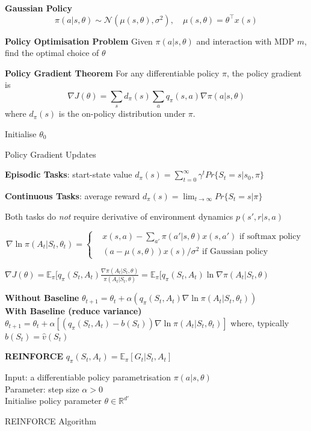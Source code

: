 \documentclass[10pt,landscape]{article}
\begin{document}
\begin{multicols}{3}
\textbf{Gaussian Policy} $$\pi(a|s, \theta) \sim \mathcal{N}(\mu(s, \theta), \sigma^2), \quad \mu(s, \theta) = \theta^\top x(s)$$

\textbf{Policy Optimisation Problem} Given $\pi(a|s, \theta)$ and interaction with MDP $m$, find the optimal choice of $\theta$

\textbf{Policy Gradient Theorem} For any differentiable policy $\pi$, the policy gradient is $$\nabla J(\theta) = \sum_s d_\pi (s) \sum_a q_\pi (s,a) \nabla \pi(a|s, \theta)$$ where $d_\pi(s)$ is the on-policy distribution under $\pi$. 

\begin{algorithm}[H]
Initialise $\theta_0$
\caption{Policy Gradient Updates}
\end{algorithm}

\textbf{Episodic Tasks}: start-state value $d_\pi (s) = \sum_{t=0}^\infty \gamma^t Pr\{S_t = s | s_0, \pi\}$

\textbf{Continuous Tasks}: average reward $d_\pi (s) = \lim_{t \rightarrow \infty} Pr\{S_t = s | \pi\}$

Both tasks do \textit{not} require derivative of environment dynamics $p(s', r|s,a)$

$$\nabla \ln \pi(A_t | S_t, \theta_t) = \begin{cases}& x(s,a) - \sum_{a'} \pi(a' | s, \theta) x(s, a') \text{ if softmax policy } \\ & (a - \mu(s, \theta)) x(s)/\sigma^2 \text{ if Gaussian policy }\end{cases}$$

$\nabla J(\theta) = \mathbb{E}_\pi [q_\pi(S_t, A_t) \frac{\nabla \pi(A_t | S_t, \theta)}{\pi (A_t | S_t, \theta)} = \mathbb{E}_\pi [q_\pi(S_t, A_t) \ln \nabla \pi(A_t | S_t, \theta)$

\textbf{Without Baseline} $\theta_{t+1} = \theta_t + \alpha(q_\pi(S_t, A_t) \nabla \ln \pi(A_t | S_t, \theta_t))$ \\
\textbf{With Baseline (reduce variance)} $\theta_{t+1} = \theta_t + \alpha[(q_\pi(S_t, A_t) - b(S_t)) \nabla \ln \pi(A_t | S_t, \theta_t)]$ where, typically $b(S_t) = \hat{v}(S_t)$

\textbf{REINFORCE} $q_\pi(S_t, A_t) = \mathbb{E}_\pi [G_t | S_t, A_t]$ 

\begin{algorithm}[H]
Input: a differentiable policy parametrisation $\pi(a|s,\theta)$ \\
Parameter: step size $\alpha > 0$ \\
Initialise policy parameter $\theta \in \mathbb{R}^{d'}$
\caption{REINFORCE Algorithm}
\end{algorithm}


\end{multicols}
\end{document}
